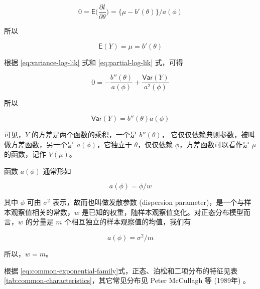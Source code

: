\documentclass[12pt,a4paper,UTF8,twoside]{book}
\theoremstyle{definition}
\theoremstyle{definition}
\theoremstyle{definition}
\theoremstyle{remark}
\begin{document}
\[ 
0 = \mathsf{E}\big( \frac{\partial l}{\partial \theta} \big) = \big\{ \mu - b'(\theta) \big\}/a(\phi)
\]

所以

\[ \mathsf{E}(Y) = \mu = b'(\theta) \]

根据 \eqref{eq:variance-log-lik} 式和 \eqref{eq:partial-log-lik} 式，可得

\[ 0 = - \frac{b''(\theta)}{a(\phi)} + \frac{\mathsf{Var}(Y)}{a^2(\phi)} \]

所以

\[ \mathsf{Var}(Y) = b''(\theta)a(\phi) \]

可见，\(Y\) 的方差是两个函数的乘积，一个是 \(b''(\theta)\)，
它仅仅依赖典则参数，被叫做方差函数，另一个是 \(a(\phi)\)，它独立于
\(\theta\)，仅仅依赖 \(\phi\)，方差函数可以看作是 \(\mu\) 的函数，记作
\(V(\mu)\)。

函数 \(a(\phi)\) 通常形如

\[ a(\phi) = \phi/w \]

其中 \(\phi\) 可由 \(\sigma^2\) 表示，故而也叫做发散参数 (dispersion
parameter)，是一个与样本观察值相关的常数，\(w\)
是已知的权重，随样本观察值变化。对正态分布模型而言，\(w\) 的分量是 \(m\)
个相互独立的样本观察值的均值，我们有

\[ a(\phi) = \sigma^2/m\]

所以，\(w = m\)。

根据
\eqref{eq:common-exponential-family}式，正态、泊松和二项分布的特征见表
\ref{tab:common-characteristics}，其它常见分布见 Peter McCullagh 等
(1989年) \citep{McCullagh1989}。
\end{document}
